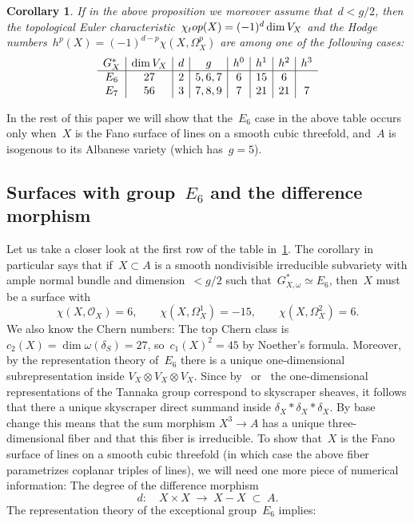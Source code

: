\documentclass[a4paper]{amsart}
\newcommand{\cO}{\mathcal{O}}
\renewcommand{\top}{\textup{top}}
\theoremstyle{plain}
\newtheorem{corollary}[theorem]{Corollary}
\theoremstyle{definition}
\numberwithin{equation}{section}
\begin{document}
\begin{corollary} \label{cor:hodge-numbers}
If in the above proposition we moreover assume that~$d < g/2$, then the topological Euler characteristic~$\chi_\top(X)=(-1)^d \dim V_X$ and the Hodge numbers~$h^p(X)=(-1)^{d-p} \chi(X, \Omega^p_X)$ are among one of the following cases: 
%
\[
\begin{array}{c|c|c|c|c|c|c|c}
G_X^\ast & \dim V_X & d & g & h^0 & h^1 & h^2 & h^3 \\ \hline 
E_6 & 27 & 2 & 5, 6, 7 & 6 & 15 & 6 &   \\
E_7 & 56 & 3 & 7, 8, 9 & 7 & 21 & 21 & 7 
\end{array} \medskip
\]
\end{corollary} 

In the rest of this paper we will show that the~$E_6$ case in the above table occurs only when~$X$ is the Fano surface of lines on a smooth cubic threefold, and~$A$ is isogenous to its Albanese variety (which has~$g=5$).


\subsection{Surfaces with group~$E_6$ and the difference morphism} 
\label{sec:DifferenceMorphism}

Let us take a closer look at the first row of the table in~\cref{cor:hodge-numbers}. The corollary in particular says that if~$X\subset A$ is a smooth nondivisible irreducible subvariety with ample normal bundle and dimension~$<g/2$ such that~$G_{X,\omega}^\ast \simeq E_6$, then~$X$ must be a surface with 
\[ 
\chi(X, \cO_X) =6, \qquad \chi(X, \Omega^1_X) = -15, \qquad \chi(X, \Omega^2_X) = 6.
\]
%
We also know the Chern numbers: The top Chern class is~$c_2(X) = \dim \omega(\delta_S) = 27$, so~$c_1(X)^2 = 45$ by Noether's formula. Moreover, by the representation theory of~$E_6$ there is a unique one-dimensional subrepresentation inside $V_X\otimes V_X\otimes V_X$. Since by~\cite[sect.~10]{WeissauerAlmostConnected} or~\cite[lemma~3.5]{KraemerMicrolocalI} the one-dimensional representations of the Tannaka group correspond to skyscraper sheaves, it follows that there a unique skyscraper direct summand inside $\delta_X*\delta_X*\delta_X$. By base change this means that the sum morphism $X^3 \to A$ has a unique three-dimensional fiber and that this fiber is irreducible. To show that~$X$ is the Fano surface of lines on a smooth cubic threefold (in which case the above fiber parametrizes coplanar triples of lines), we will need one more piece of numerical information: The degree of the difference morphism
%
\[
 d\colon \quad X \times X \;\longrightarrow\; X - X \;\subset\; A.
\]
%
The representation theory of the exceptional group~$E_6$ implies:
\end{document}
